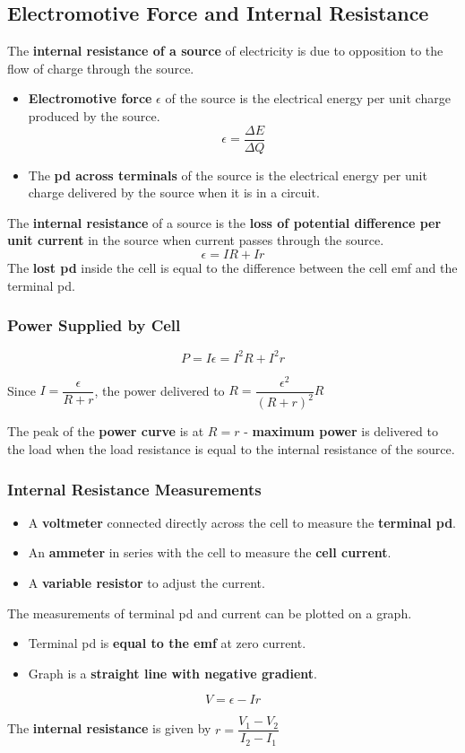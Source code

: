 \subsection{Electromotive Force and Internal Resistance}

The \textbf{internal resistance of a source} of electricity is due to opposition to the flow of charge through the source.
\begin{itemize}
    \item \textbf{Electromotive force} $\epsilon$ of the source is the electrical energy per unit charge produced by the source.
        $$\epsilon=\frac{\Delta E}{\Delta Q}$$
    \item The \textbf{pd across terminals} of the source is the electrical energy per unit charge delivered by the source when it is in a circuit.
\end{itemize}

The \textbf{internal resistance} of a source is the \textbf{loss of potential difference per unit current} in the source when current passes through the source.
$$\epsilon=IR+Ir$$
The \textbf{lost pd} inside the cell is equal to the difference between the cell emf and the terminal pd.

\subsubsection*{Power Supplied by Cell}
$$P=I\epsilon=I^2R+I^2r$$

Since $I=\dfrac{\epsilon}{R+r}$, the power delivered to $R=\dfrac{\epsilon^2}{(R+r)^2}R$

The peak of the \textbf{power curve} is at $R=r$ - \textbf{maximum power} is delivered to the load when the load resistance is equal to the internal resistance of the source.

\subsubsection*{Internal Resistance Measurements}

\begin{itemize}
    \item A \textbf{voltmeter} connected directly across the cell to measure the \textbf{terminal pd}.
    \item An \textbf{ammeter} in series with the cell to measure the \textbf{cell current}.
    \item A \textbf{variable resistor} to adjust the current.
\end{itemize}

The measurements of terminal pd and current can be plotted on a graph.
\begin{itemize}
    \item Terminal pd is \textbf{equal to the emf} at zero current.
    \item Graph is a \textbf{straight line with negative gradient}.
\end{itemize}
$$V=\epsilon-Ir$$

The \textbf{internal resistance} is given by $r=\dfrac{V_1-V_2}{I_2-I_1}$
